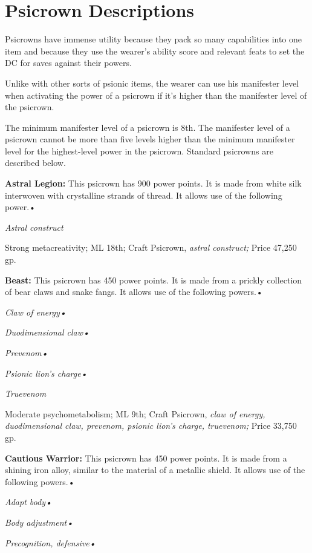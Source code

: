\documentclass{article}
\begin{document}
\vspace{12pt}
\section*{\textbf{Psicrown Descriptions}}

Psicrowns have immense utility because they pack so many capabilities into one 
item and because they use the wearer's ability score and relevant feats to set 
the DC for saves against their powers.

Unlike with other sorts of psionic items, the wearer can use his manifester level 
when activating the power of a psicrown if it's higher than the manifester level 
of the psicrown. 

The minimum manifester level of a psicrown is 8th. The manifester level of a psicrown 
cannot be more than five levels higher than the minimum manifester level for the 
highest-level power in the psicrown. Standard psicrowns are described below.

\textbf{Astral Legion:} This psicrown has 900 power points. It is made from white 
silk interwoven with crystalline strands of thread. It allows use of the following 
power.• 

\textit{Astral construct }

Strong metacreativity; ML 18th; Craft Psicrown, \textit{astral construct; }Price 
47,250 gp.

\textbf{Beast:} This psicrown has 450 power points. It is made from a prickly collection 
of bear claws and snake fangs. It allows use of the following powers.• 

\textit{Claw of energy• }

\textit{Duodimensional claw• }

\textit{Prevenom• }

\textit{Psionic lion's charge• }

\textit{Truevenom}

Moderate psychometabolism; ML 9th; Craft Psicrown, \textit{claw of energy, duodimensional 
claw, prevenom, psionic lion's charge, truevenom; }Price 33,750 gp.

\textbf{Cautious Warrior:} This psicrown has 450 power points. It is made from 
a shining iron alloy, similar to the material of a metallic shield. It allows use 
of the following powers.• 

\textit{Adapt body• }

\textit{Body adjustment• }

\textit{Precognition, defensive• }
\end{document}
